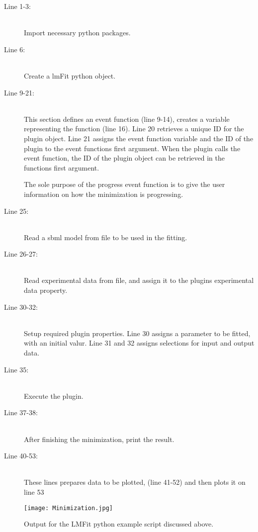 \begin{description}
{
\setlength{}
}
\item[Line 1-3:] \hfill \\
    Import necessary python packages.
\item[Line 6:] \hfill \\
Create a lmFit python object.
\item[Line 9-21:]\hfill \\
 This section defines an event function (line 9-14), creates a 
variable representing the function (line 16). Line 20 retrieves a unique ID for the plugin object. Line 21 assigns the event function variable and the ID of the plugin to the event
functions first argument. 
When the plugin calls the event function, the ID of the plugin object can be retrieved in the functions first argument.

The sole purpose of the progress event function is to give the user information on how the minimization is progressing. 

\item[Line 25:] \hfill \\
Read a sbml model from file to be used in the fitting.
\item[Line 26-27:]\hfill \\
 Read experimental data from  file, and assign it to the plugins experimental data property.
\item[Line 30-32:]\hfill \\
 Setup required plugin properties. Line 30 assigns a parameter to be fitted, with an initial valur. Line 31 and 32 assigns selections for input and output data.
\item[Line 35:] \hfill \\
Execute the plugin.
\item[Line 37-38:]\hfill \\
 After finishing the minimization, print the result.
\item[Line 40-53:]\hfill \\
 These lines prepares data to be plotted, (line 41-52) and then plots it on line 53

\end{description}

\begin{sidewaysfigure}
\centering
\texttt{[image: Minimization.jpg]}
\caption{Output for the LMFit python example script discussed above.}
\label{fig:lmfitFig}
\end{sidewaysfigure}






